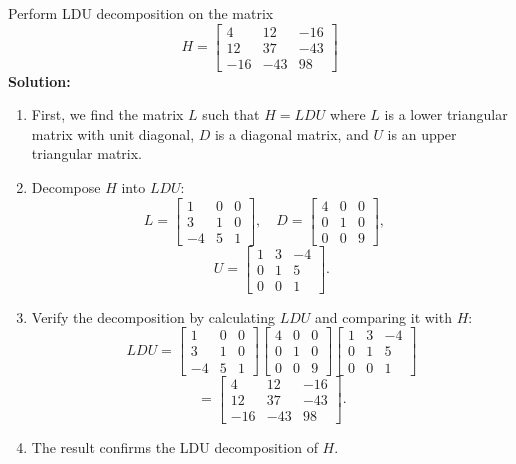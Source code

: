 \documentclass[8pt, a4paper, landscape]{extarticle}
\begin{document}
\begin{multicols*}{4}
  Perform LDU decomposition on the matrix
  \[
    H = \begin{bmatrix} 4 & 12 & -16 \\ 12 & 37 & -43 \\ -16 & -43 & 98 \end{bmatrix}
  \]
  \textbf{Solution:}
  \begin{enumerate}
    \item First, we find the matrix $L$ such that $H = LDU$ where $L$ is a lower triangular matrix with unit diagonal, $D$ is a diagonal matrix, and $U$ is an upper triangular matrix.
    \item Decompose $H$ into $LDU$:
          \[
            L = \begin{bmatrix}
              1  & 0 & 0 \\
              3  & 1 & 0 \\
              -4 & 5 & 1
            \end{bmatrix}, \quad
            D = \begin{bmatrix}
              4 & 0 & 0 \\
              0 & 1 & 0 \\
              0 & 0 & 9
            \end{bmatrix}, \quad
          \]
          \[
            U = \begin{bmatrix}
              1 & 3 & -4 \\
              0 & 1 & 5  \\
              0 & 0 & 1
            \end{bmatrix}.
          \]
    \item Verify the decomposition by calculating $LDU$ and comparing it with $H$:
          \[
            LDU = \begin{bmatrix}
              1  & 0 & 0 \\
              3  & 1 & 0 \\
              -4 & 5 & 1
            \end{bmatrix}
            \begin{bmatrix}
              4 & 0 & 0 \\
              0 & 1 & 0 \\
              0 & 0 & 9
            \end{bmatrix}
            \begin{bmatrix}
              1 & 3 & -4 \\
              0 & 1 & 5  \\
              0 & 0 & 1
            \end{bmatrix}
          \]
          \[
            = \begin{bmatrix}
              4   & 12  & -16 \\
              12  & 37  & -43 \\
              -16 & -43 & 98
            \end{bmatrix}.
          \]
    \item The result confirms the LDU decomposition of $H$.
  \end{enumerate}


\end{multicols*}

\pagebreak
\end{document}
